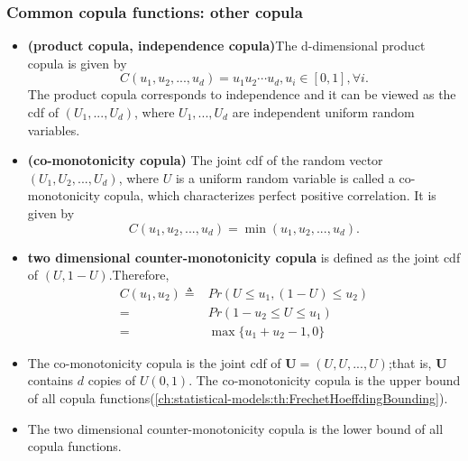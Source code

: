 \begin{refsection}
\cite{cherubini2004copula}

\subsubsection{Common copula functions: other copula}

\begin{definition}\cite[187]{ruppert2015statistics}\cite[190]{mcneil2015quantitative}
	\begin{itemize}
		\item \textbf{(product copula, independence copula)}The d-dimensional product copula is given by
		$$C(u_1,u_2,...,u_d) = u_1u_2\cdots u_d, u_i\in [0,1],\forall i.$$
		The product copula corresponds to independence and it can be viewed as the cdf of $(U_1,...,U_d)$, where $U_1,...,U_d$ are independent uniform random variables.
		\item \textbf{(co-monotonicity copula)} The joint cdf of the random vector $(U_1,U_2,...,U_d)$, where $U$ is a uniform random variable is called a co-monotonicity copula, which characterizes perfect positive correlation. It is given by
		$$C(u_1,u_2,...,u_d) = \min(u_1,u_2,...,u_d).$$
		\item \textbf{two dimensional counter-monotonicity copula} is defined as the joint cdf of $(U,1-U)$.Therefore,
		\begin{align*}
		C(u_1,u_2) \triangleq &Pr(U\leq u_1,(1-U)\leq u_2) \\
		=& Pr(1-u_2\leq U\leq u_1) \\
		=& \max\{u_1+u_2-1,0\}
		\end{align*}
	\end{itemize}	
\end{definition}

\begin{remark}[interpretation]\cite[185]{ruppert2015statistics}\hfill
\begin{itemize}
	\item The co-monotonicity copula is the joint cdf of $\bm{U}=(U,U,...,U)$;that is, $\bm{U}$ contains $d$ copies of $U(0,1)$. The co-monotonicity copula is the upper bound of all copula functions(\autoref{ch:statistical-models:th:FrechetHoeffdingBounding}). 
	\item The two dimensional counter-monotonicity copula is the lower bound of all copula functions.
\end{itemize}
\end{remark}



\end{refsection}
